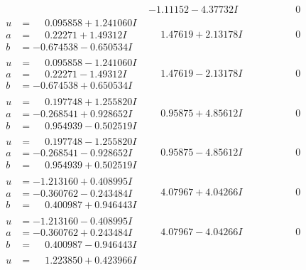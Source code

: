 \documentclass[1p]{elsarticle_modified}
\theoremstyle{definition}
\begin{document}
$$\begin{array}{c|c|c}
 & -1.11152 - 4.37732 I & \phantom{-0.000000 } 0 \\ \hline\begin{aligned}
u &= \phantom{-}0.095858 + 1.241060 I \\
a &= \phantom{-}0.22271 + 1.49312 I \\
b &= -0.674538 - 0.650534 I\end{aligned}
 & \phantom{-}1.47619 + 2.13178 I & \phantom{-0.000000 } 0 \\ \hline\begin{aligned}
u &= \phantom{-}0.095858 - 1.241060 I \\
a &= \phantom{-}0.22271 - 1.49312 I \\
b &= -0.674538 + 0.650534 I\end{aligned}
 & \phantom{-}1.47619 - 2.13178 I & \phantom{-0.000000 } 0 \\ \hline\begin{aligned}
u &= \phantom{-}0.197748 + 1.255820 I \\
a &= -0.268541 + 0.928652 I \\
b &= \phantom{-}0.954939 - 0.502519 I\end{aligned}
 & \phantom{-}0.95875 + 4.85612 I & \phantom{-0.000000 } 0 \\ \hline\begin{aligned}
u &= \phantom{-}0.197748 - 1.255820 I \\
a &= -0.268541 - 0.928652 I \\
b &= \phantom{-}0.954939 + 0.502519 I\end{aligned}
 & \phantom{-}0.95875 - 4.85612 I & \phantom{-0.000000 } 0 \\ \hline\begin{aligned}
u &= -1.213160 + 0.408995 I \\
a &= -0.360762 - 0.243484 I \\
b &= \phantom{-}0.400987 + 0.946443 I\end{aligned}
 & \phantom{-}4.07967 + 4.04266 I & \phantom{-0.000000 } 0 \\ \hline\begin{aligned}
u &= -1.213160 - 0.408995 I \\
a &= -0.360762 + 0.243484 I \\
b &= \phantom{-}0.400987 - 0.946443 I\end{aligned}
 & \phantom{-}4.07967 - 4.04266 I & \phantom{-0.000000 } 0 \\ \hline\begin{aligned}
u &= \phantom{-}1.223850 + 0.423966 I \\

\end{aligned}
\end{array}$$
\end{document}

